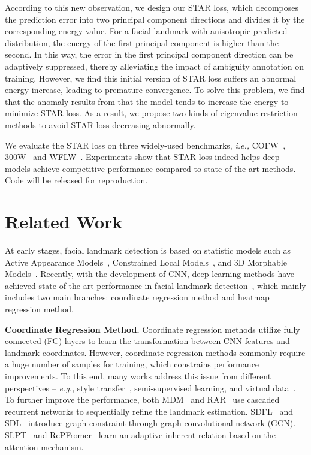 \documentclass[10pt,twocolumn,letterpaper]{article}
\begin{document}
According to this new observation, we design our STAR loss, which decomposes the prediction error into two principal component directions and divides it by the corresponding energy value.
For a facial landmark with anisotropic predicted distribution, the energy of the first principal component is higher than the second. 
In this way, the error in the first principal component direction can be adaptively suppressed, thereby alleviating the impact of ambiguity annotation on training. 
However, we find this initial version of STAR loss suffers an abnormal energy increase, leading to premature convergence. 
To solve this problem, we find that the anomaly results from that the model tends to increase the energy to minimize STAR loss. 
As a result, we propose two kinds of eigenvalue restriction methods to avoid STAR loss decreasing abnormally.

We evaluate the STAR loss on three widely-used benchmarks, \emph{i.e.,} COFW~\cite{burgos2013robust}, 300W~\cite{sagonas2013300} and WFLW~\cite{wu2018lab}.
Experiments show that STAR loss indeed helps deep models achieve competitive performance compared to state-of-the-art methods.
Code will be released for reproduction.

\section{Related Work}

At early stages, facial landmark detection is based on statistic models such as Active Appearance Models~\cite{cootes2001active, matthews2004active}, Constrained Local Models~\cite{cristinacce2008automatic}, and 3D Morphable Models~\cite{blanz2003face}.
Recently, with the development of CNN, deep learning methods have achieved state-of-the-art performance in facial landmark detection~\cite{lin2021structure, huang2021adnet, lan2021hih, xia2022splt}, which mainly includes two main branches: coordinate regression method and heatmap regression method.

\noindent\textbf{Coordinate Regression Method.}
Coordinate regression methods\cite{zhou2013extensive, zhang2014facial, feng2018wing} utilize fully connected (FC) layers to learn the transformation between CNN features and landmark coordinates.
However, coordinate regression methods commonly require a huge number of samples for training, which constrains performance improvements.
To this end, many works address this issue from different perspectives -- \emph{e.g.,} style transfer~\cite{dong2018style,qian2019aggregation}, semi-supervised learning\cite{browatzki20203fabrec,dong2020supervision}, and virtual data~\cite{wood2021fake}. 
To further improve the performance, both MDM~\cite{trigeorgis2016mnemonic} and RAR~\cite{xiao2016robust} use cascaded recurrent networks to sequentially refine the landmark estimation. SDFL~\cite{lin2021structure} and SDL~\cite{li2020structured} introduce graph constraint through graph convolutional network (GCN). SLPT~\cite{SLPT} and RePFromer~\cite{li2022repformer} learn an adaptive inherent relation based on the attention mechanism.
\end{document}
